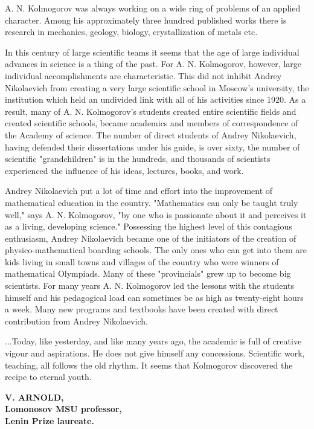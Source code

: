 \documentclass{article}
\begin{document}
A. N. Kolmogorov was always working on a wide ring of problems of an applied character.
Among his approximately three hundred published works there is research in mechanics, geology, biology, crystallization of metals etc.

In this century of large scientific teams it seems that the age of large individual advances in science is a thing of the past.
For A. N. Kolmogorov, however, large individual accomplishments are characteristic.
This did not inhibit Andrey Nikolaevich from creating a very large scientific school in Moscow's university, the institution which held an undivided link with all of his activities since 1920.
As a result, many of A. N. Kolmogorov's students created entire scientific fields and created scientific schools, became academics and members of correspondence of the Academy of science.
The number of direct students of Andrey Nikolaevich, having defended their dissertations under his guide, is over sixty, the number of scientific "grandchildren" is in the hundreds, and thousands of scientists experienced the influence of his ideas, lectures, books, and work.

Andrey Nikolaevich put a lot of time and effort into the improvement of mathematical education in the country.
"Mathematics can only be taught truly well," says A. N. Kolmogorov, "by one who is passionate about it and perceives it as a living, developing science."
Possessing the highest level of this contagious enthusiasm, Andrey Nikolaevich became one of the initiators of the creation of physico-mathematical boarding schools.
The only ones who can get into them are kids living in small towns and villages of the country who were winners of mathematical Olympiads.
Many of these "provincials" grew up to become big scientists.
For many years A. N. Kolmogorov led the lessons with the students himself and his pedagogical load can sometimes be as high as twenty-eight hours a week.
Many new programs and textbooks have been created with direct contribution from Andrey Nikolaevich.

...Today, like yesterday, and like many years ago, the academic is full of creative vigour and aspirations.
He does not give himself any concessions.
Scientific work, teaching, all follows the old rhythm.
It seems that Kolmogorov discovered the recipe to eternal youth.

\begin{flushright}
\textbf{V. ARNOLD,\\Lomonosov MSU professor,\\Lenin Prize laureate.}
\end{flushright}
\end{document}
